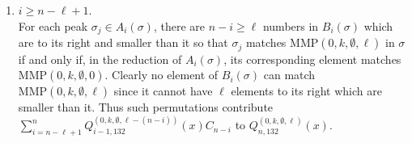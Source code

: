 \documentclass[
final,nomarks
]{dmtcs-episciences}
\newcommand{\Qmmn}[2]{Q_{#2,132}^{(#1)}(x)}
\newcommand{\MMP}{\mathrm{MMP}}
\begin{document}
\begin{enumerate}[{\bf Case }\bf 1.]
	\item \begin{math}i\geq n-\ell+1\end{math}. \\
	For each peak \begin{math}\sigma_j \in A_i(\sigma)\end{math},   
	there are \begin{math}n-i\geq \ell\end{math} numbers in \begin{math}B_i(\sigma)\end{math} which are to its right and smaller than it 
	so that \begin{math}\sigma_j\end{math} matches \begin{math}\MMP(0,k,\emptyset,\ell)\end{math} in \begin{math}\sigma\end{math} if and only if, 
	in the reduction of \begin{math}A_i(\sigma)\end{math}, its corresponding element matches 
	\begin{math}\MMP(0,k,\emptyset,0)\end{math}. Clearly no element of \begin{math}B_i(\sigma) \end{math} can match \begin{math}\MMP(0,k,\emptyset,\ell)\end{math} since 
	it cannot have \begin{math}\ell\end{math} elements to its right which are smaller than it. 
	Thus such 
	permutations contribute \begin{math}\sum_{i=n-\ell+1}^{n} \Qmmn{0,k,\emptyset,\ell-(n-i)}{i-1} C_{n-i}\end{math} to 
	\begin{math}\Qmmn{0,k,\emptyset,\ell}{n}\end{math}.
	
\end{enumerate}
\end{document}
